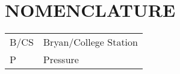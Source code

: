 \chapter*{NOMENCLATURE}

\begin{tabular}{ll}
B/CS & Bryan/College Station \tabularnewline
P & Pressure \tabularnewline
\end{tabular}

\pagebreak{}
